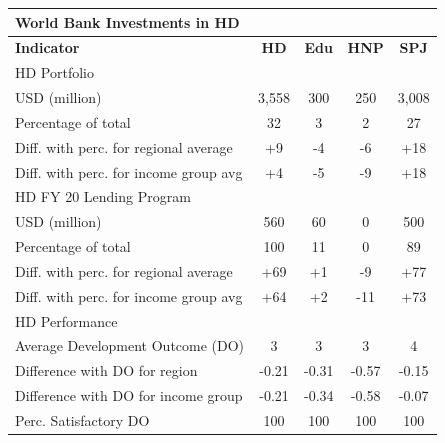 \documentclass[9.2pt,twocolumn]{article}
\begin{document}
\begin{table}[H]
\small
\begin{tabular}{lcccc}
\textbf{World Bank Investments in HD} & \textbf{} & \textbf{} & \textbf{} & \textbf{} \\ \hline
\textbf{Indicator} & \textbf{HD} & \textbf{Edu} & \textbf{HNP} & \textbf{SPJ} \\ \hline
\cellcolor{iceberg}HD Portfolio & \cellcolor{iceberg} & \cellcolor{iceberg} & \cellcolor{iceberg} & \cellcolor{iceberg} \\ \hline
USD (million) & 3,558 & 300 & 250 & 3,008 \\ 
Percentage of total & \cellcolor{asparagus} 32 & \cellcolor{arylideyellow} 3 & \cellcolor{arylideyellow} 2 & \cellcolor{asparagus} 27 \\ 
Diff. with perc. for regional average & +9 & -4 & -6 & +18 \\ 
Diff. with perc. for income group avg & +4 & -5 & -9 & +18 \\ \hline
\cellcolor{iceberg}HD FY 20 Lending Program & \cellcolor{iceberg} & \cellcolor{iceberg} & \cellcolor{iceberg} & \cellcolor{iceberg} \\ \hline 
USD (million) & 560 & 60 & 0 & 500 \\ 
Percentage of total & \cellcolor{asparagus} 100 & \cellcolor{asparagus} 11 & \cellcolor{blush} 0 & \cellcolor{asparagus} 89 \\ 
Diff. with perc. for regional average & +69 & +1 & -9 & +77 \\ 
Diff. with perc. for income group avg & +64 & +2 & -11 & +73 \\ \hline
\cellcolor{iceberg}HD Performance & \cellcolor{iceberg} & \cellcolor{iceberg} & \cellcolor{iceberg} & \cellcolor{iceberg} \\ \hline
Average Development Outcome (DO) & \cellcolor{arylideyellow} 3 & \cellcolor{blush} 3 & \cellcolor{blush} 3 & \cellcolor{arylideyellow} 4 \\ 
Difference with DO for region & -0.21 & -0.31 & -0.57 & -0.15 \\ 
Difference with DO for income group & -0.21 & -0.34 & -0.58 & -0.07 \\ 
Perc. Satisfactory DO & 100 & 100 & 100 & 100 \\ 

\end{tabular}
\end{table}
\end{document}
